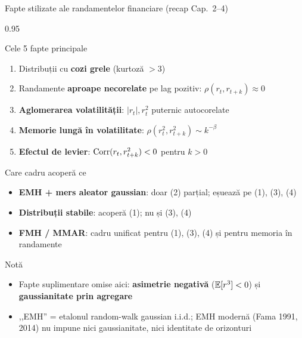 \documentclass[9pt, aspectratio=169, t]{beamer}
\begin{document}
\begin{frame}[shrink=15]{Fapte stilizate ale randamentelor financiare (recap Cap.~2--4)}
\begin{cminipage}{0.95\textwidth}
\begin{block}{Cele 5 fapte principale}
\begin{enumerate}\setlength{\itemsep}{2pt}
    \item Distribuții cu \textbf{cozi grele} (kurtoză $>3$)
    \item Randamente \textbf{aproape necorelate} pe lag pozitiv: $\rho(r_t,r_{t+k})\approx 0$
    \item \textbf{Aglomerarea volatilității}: $|r_t|, r_t^2$ puternic autocorelate
    \item \textbf{Memorie lungă în volatilitate}: $\rho(r_t^2,r_{t+k}^2)\sim k^{-\beta}$
    \item \textbf{Efectul de levier}: $\text{Corr}(r_t, r_{t+k}^2)<0$ pentru $k>0$
\end{enumerate}
\end{block}
\begin{exampleblock}{Care cadru acoperă ce}
\begin{itemize}\setlength{\itemsep}{0pt}
    \item \textbf{EMH + mers aleator gaussian}: doar (2) parțial; eșuează pe (1), (3), (4)
    \item \textbf{Distribuții stabile}: acoperă (1); nu și (3), (4)
    \item \textbf{FMH / MMAR}: cadru unificat pentru (1), (3), (4) și pentru memoria în randamente
\end{itemize}
\end{exampleblock}
\begin{alertblock}{Notă}
\begin{itemize}\setlength{\itemsep}{0pt}
    \item Fapte suplimentare omise aici: \textbf{asimetrie negativă} ($\mathbb{E}[r^3]<0$) și \textbf{gaussianitate prin agregare}
    \item ,,EMH'' = etalonul random-walk gaussian i.i.d.; EMH modernă (Fama 1991, 2014) nu impune nici gaussianitate, nici identitate de orizonturi
\end{itemize}
\end{alertblock}
\end{cminipage}
\end{frame}
\end{document}
